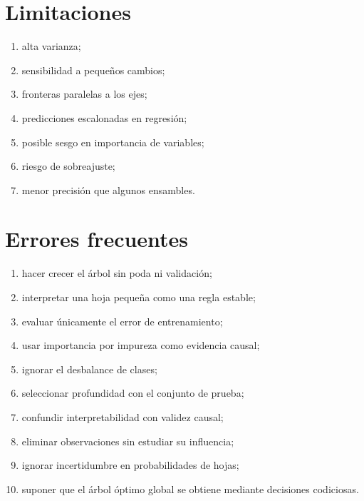 \documentclass[
  spanish,
  10.5pt,
  letterpaper,
  DIV=11,
  numbers=noendperiod,
  oneside,
  open=any]{scrreprt}
\providecommand{\tightlist}{%
  \setlength{\itemsep}{0pt}\setlength{\parskip}{0pt}}
\theoremstyle{definition}
\theoremstyle{definition}
\theoremstyle{plain}
\theoremstyle{remark}
\begin{document}
\section*{Limitaciones}\label{limitaciones-1}


\begin{enumerate}
\def\labelenumi{\arabic{enumi}.}
\tightlist
\item
  alta varianza;
\item
  sensibilidad a pequeños cambios;
\item
  fronteras paralelas a los ejes;
\item
  predicciones escalonadas en regresión;
\item
  posible sesgo en importancia de variables;
\item
  riesgo de sobreajuste;
\item
  menor precisión que algunos ensambles.
\end{enumerate}

\section*{Errores frecuentes}\label{errores-frecuentes-11}


\begin{enumerate}
\def\labelenumi{\arabic{enumi}.}
\tightlist
\item
  hacer crecer el árbol sin poda ni validación;
\item
  interpretar una hoja pequeña como una regla estable;
\item
  evaluar únicamente el error de entrenamiento;
\item
  usar importancia por impureza como evidencia causal;
\item
  ignorar el desbalance de clases;
\item
  seleccionar profundidad con el conjunto de prueba;
\item
  confundir interpretabilidad con validez causal;
\item
  eliminar observaciones sin estudiar su influencia;
\item
  ignorar incertidumbre en probabilidades de hojas;
\item
  suponer que el árbol óptimo global se obtiene mediante decisiones
  codiciosas.
\end{enumerate}
\end{document}
